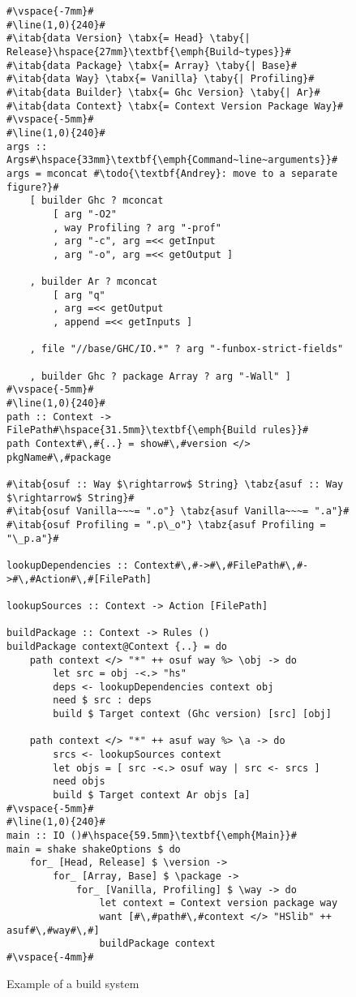 \begin{figure}
\begin{lstlisting}
#\vspace{-7mm}#
#\line(1,0){240}#
#\itab{data Version} \tabx{= Head} \taby{| Release}\hspace{27mm}\textbf{\emph{Build~types}}#
#\itab{data Package} \tabx{= Array} \taby{| Base}#
#\itab{data Way} \tabx{= Vanilla} \taby{| Profiling}#
#\itab{data Builder} \tabx{= Ghc Version} \taby{| Ar}#
#\itab{data Context} \tabx{= Context Version Package Way}#
#\vspace{-5mm}#
#\line(1,0){240}#
args :: Args#\hspace{33mm}\textbf{\emph{Command~line~arguments}}#
args = mconcat #\todo{\textbf{Andrey}: move to a separate figure?}#
    [ builder Ghc ? mconcat
        [ arg "-O2"
        , way Profiling ? arg "-prof"
        , arg "-c", arg =<< getInput 
        , arg "-o", arg =<< getOutput ]

    , builder Ar ? mconcat
        [ arg "q"
        , arg =<< getOutput
        , append =<< getInputs ]

    , file "//base/GHC/IO.*" ? arg "-funbox-strict-fields" 

    , builder Ghc ? package Array ? arg "-Wall" ]
#\vspace{-5mm}#
#\line(1,0){240}#
path :: Context -> FilePath#\hspace{31.5mm}\textbf{\emph{Build rules}}#
path Context#\,#{..} = show#\,#version </> pkgName#\,#package

#\itab{osuf :: Way $\rightarrow$ String} \tabz{asuf :: Way $\rightarrow$ String}#
#\itab{osuf Vanilla~~~= ".o"} \tabz{asuf Vanilla~~~= ".a"}#
#\itab{osuf Profiling = ".p\_o"} \tabz{asuf Profiling = "\_p.a"}#

lookupDependencies :: Context#\,#->#\,#FilePath#\,#->#\,#Action#\,#[FilePath]

lookupSources :: Context -> Action [FilePath]

buildPackage :: Context -> Rules ()
buildPackage context@Context {..} = do
    path context </> "*" ++ osuf way %> \obj -> do
        let src = obj -<.> "hs"
        deps <- lookupDependencies context obj
        need $ src : deps
        build $ Target context (Ghc version) [src] [obj]

    path context </> "*" ++ asuf way %> \a -> do
        srcs <- lookupSources context
        let objs = [ src -<.> osuf way | src <- srcs ]
        need objs
        build $ Target context Ar objs [a]
#\vspace{-5mm}#
#\line(1,0){240}#
main :: IO ()#\hspace{59.5mm}\textbf{\emph{Main}}#
main = shake shakeOptions $ do
    for_ [Head, Release] $ \version ->
        for_ [Array, Base] $ \package ->
            for_ [Vanilla, Profiling] $ \way -> do
                let context = Context version package way
                want [#\,#path#\,#context </> "HSlib" ++ asuf#\,#way#\,#]
                buildPackage context
#\vspace{-4mm}#
\end{lstlisting}

\caption{Example of a build system\label{fig:example-abstractions}}
\end{figure}
